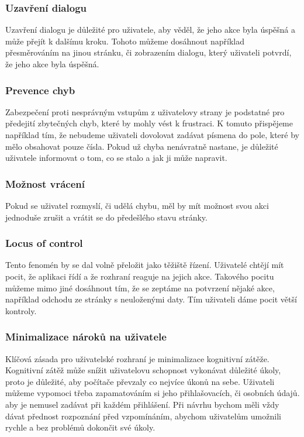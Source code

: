 \subsubsection*{Uzavření dialogu}
Uzavření dialogu je důležité pro uživatele, aby věděl, že jeho akce byla úspěšná a může přejít k dalšímu kroku. Tohoto můžeme dosáhnout například přesměrováním na jinou stránku, či zobrazením dialogu, který uživateli potvrdí, že jeho akce byla úspěšná.

\subsubsection*{Prevence chyb}
Zabezpečení proti nesprávným vstupům z uživatelovy strany je podstatné pro předejití zbytečných chyb, které by mohly vést k frustraci. K tomuto přispějeme například tím, že nebudeme uživateli dovolovat zadávat písmena do pole, které by mělo obsahovat pouze čísla. Pokud už chyba nenávratně nastane, je důležité uživatele informovat o tom, co se stalo a jak ji může napravit.

\subsubsection*{Možnost vrácení}
Pokud se uživatel rozmyslí, či udělá chybu, měl by mít možnost svou akci jednoduše zrušit a vrátit se do předešlého stavu stránky.

\subsubsection*{Locus of control}
Tento fenomén by se dal volně přeložit jako těžiště řízení. Uživatelé chtějí mít pocit, že aplikaci řídí a že rozhraní reaguje na jejich akce. Takového pocitu můžeme mimo jiné dosáhnout tím, že se zeptáme na potvrzení nějaké akce, například odchodu ze stránky s neuloženými daty. Tím uživateli dáme pocit větší kontroly.

\subsubsection*{Minimalizace nároků na uživatele}
Klíčová zásada pro uživatelské rozhraní je minimalizace kognitivní zátěže. Kognitivní zátěž může snížit uživatelovu schopnost vykonávat důležité úkoly, proto je důležité, aby počítače převzaly co nejvíce úkonů na sebe. Uživateli můžeme vypomoci třeba zapamatováním si jeho přihlašovacích, či osobních údajů. aby je nemusel zadávat při každém přihlášení. Při návrhu bychom měli vždy dávat přednost rozpoznání před vzpomínáním, abychom uživatelům umožnili rychle a bez problémů dokončit své úkoly.


